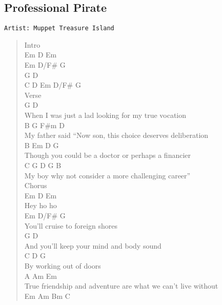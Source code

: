 \documentclass[11pt]{article}
\begin{document}
\subsection{Professional Pirate}
\label{sec:org245427e}
\begin{verbatim}
Artist: Muppet Treasure Island
\end{verbatim}
\begin{verse}
Intro\\
Em D   Em\\
Em D/F\# G\\
G       D\\
C  D Em D/F\# G\\
\vspace*{1em}
Verse\\
\vspace*{1em}
G                                                D\\
When I was just a lad looking for my true vocation\\
B                 G                    F\#m       D\\
My father said ``Now son, this choice deserves deliberation\\
B                    Em                  D            G\\
Though you could be a doctor or perhaps a financier\\
C                G               D           G      B\\
My boy why not consider a more challenging career''\\
\vspace*{1em}
Chorus\\
\vspace*{1em}
Em D Em\\
Hey ho ho\\
\hspace*{9em}Em       D/F\#      G\\
You'll cruise to foreign shores\\
G                             D\\
And you'll keep your mind and body sound\\
\hspace*{3em}C        D    G\\
By working out of doors\\
A    Am                                Em\\
True friendship and adventure are what we can't live without\\
Em  Am   Bm       C\\

\end{verse}
\end{document}
